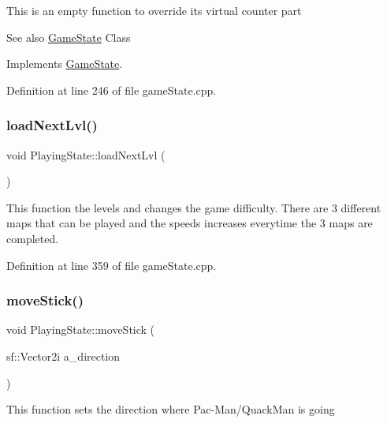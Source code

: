 This is an empty function to override it\textquotesingle{}s virtual counter part \begin{DoxySeeAlso}{See also}
\hyperlink{class_game_state}{Game\+State} Class 
\end{DoxySeeAlso}


Implements \hyperlink{class_game_state_a4cd6f5b4ad23fc08dca287df26d94b94}{Game\+State}.



Definition at line 246 of file game\+State.\+cpp.

\mbox{\label{class_playing_state_a18ea22c1b551f6d81d030853f8ce9b73}} 
\subsubsection{\texorpdfstring{load\+Next\+Lvl()}{loadNextLvl()}}
{\footnotesize\ttfamily void Playing\+State\+::load\+Next\+Lvl (\begin{DoxyParamCaption}{ }\end{DoxyParamCaption})}

This function the levels and changes the game difficulty. There are 3 different maps that can be played and the speeds increases everytime the 3 maps are completed. 

Definition at line 359 of file game\+State.\+cpp.

\mbox{\label{class_playing_state_af205fbb130a2c83b260d80359de914e8}} 
\subsubsection{\texorpdfstring{move\+Stick()}{moveStick()}}
{\footnotesize\ttfamily void Playing\+State\+::move\+Stick (\begin{DoxyParamCaption}\item[{sf\+::\+Vector2i}]{a\+\_\+direction }\end{DoxyParamCaption})\hspace{0.3cm}{\ttfamily [virtual]}}

This function sets the direction where Pac-\/\+Man/\+Quack\+Man is going



